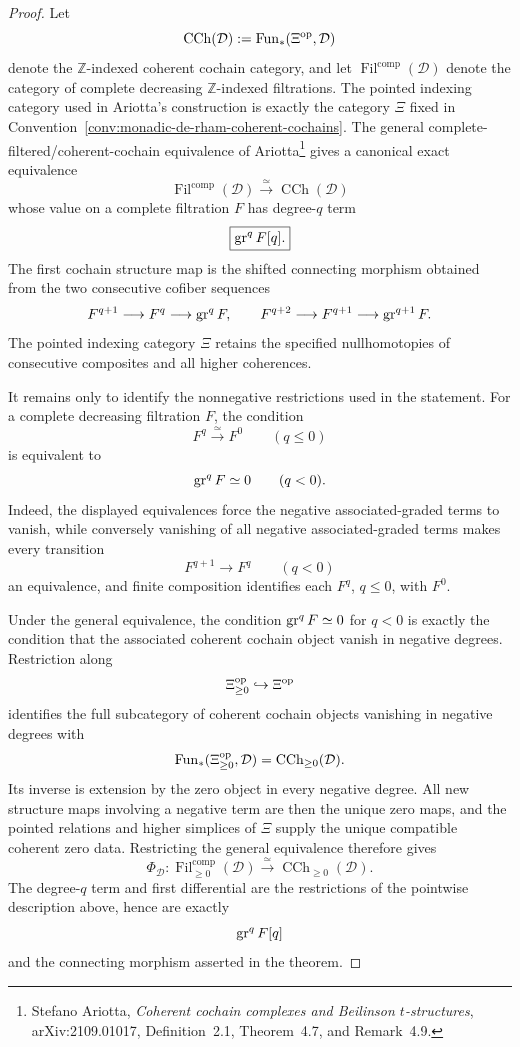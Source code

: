 \begin{proof}
Let
\[
    \operatorname{CCh}(\mathcal D)
    :=
    \operatorname{Fun}_*(\Xi^{\mathrm{op}},\mathcal D)
\]
denote the \(\mathbb Z\)-indexed coherent cochain category, and let
\(\operatorname{Fil}^{\mathrm{comp}}(\mathcal D)\) denote the category of
complete decreasing \(\mathbb Z\)-indexed filtrations.  The pointed indexing
category used in Ariotta's construction is exactly the category \(\Xi\) fixed in
Convention~\ref{conv:monadic-de-rham-coherent-cochains}.  The general
complete-filtered/coherent-cochain equivalence of Ariotta\footnote{Stefano
Ariotta, \emph{Coherent cochain complexes and Beilinson
\(t\)-structures}, arXiv:2109.01017, Definition~2.1, Theorem~4.7, and
Remark~4.9.} gives a canonical exact equivalence
\[
\boxed{
    \operatorname{Fil}^{\mathrm{comp}}(\mathcal D)
    \xrightarrow{\simeq}
    \operatorname{CCh}(\mathcal D)
}
\]
whose value on a complete filtration \(F\) has degree-\(q\) term
\[
\boxed{
    \operatorname{gr}^qF[q].
}
\]
The first cochain structure map is the shifted connecting morphism obtained
from the two consecutive cofiber sequences
\[
    F^{q+1}\longrightarrow F^q\longrightarrow\operatorname{gr}^qF,
    \qquad
    F^{q+2}\longrightarrow F^{q+1}\longrightarrow\operatorname{gr}^{q+1}F.
\]
The pointed indexing category \(\Xi\) retains the specified nullhomotopies of
consecutive composites and all higher coherences.

It remains only to identify the nonnegative restrictions used in the statement.
For a complete decreasing filtration \(F\), the condition
\[
    F^q\xrightarrow{\simeq}F^0
    \qquad(q\leq0)
\]
is equivalent to
\[
    \operatorname{gr}^qF\simeq0
    \qquad(q<0).
\]
Indeed, the displayed equivalences force the negative associated-graded terms
to vanish, while conversely vanishing of all negative associated-graded terms
makes every transition
\[
    F^{q+1}\longrightarrow F^q
    \qquad(q<0)
\]
an equivalence, and finite composition identifies each \(F^q\), \(q\leq0\),
with \(F^0\).

Under the general equivalence, the condition
\(\operatorname{gr}^qF\simeq0\) for \(q<0\) is exactly the condition that the associated
coherent cochain object vanish in negative degrees.  Restriction along
\[
    \Xi_{\geq0}^{\mathrm{op}}\hookrightarrow\Xi^{\mathrm{op}}
\]
identifies the full subcategory of coherent cochain objects vanishing in
negative degrees with
\[
    \operatorname{Fun}_*(\Xi_{\geq0}^{\mathrm{op}},\mathcal D)
    =
    \operatorname{CCh}_{\geq0}(\mathcal D).
\]
Its inverse is extension by the zero object in every negative degree.  All
new structure maps involving a negative term are then the unique zero maps,
and the pointed relations and higher simplices of \(\Xi\) supply the unique
compatible coherent zero data.  Restricting the general equivalence therefore
gives
\[
\boxed{
    \Phi_{\mathcal D}:
    \operatorname{Fil}^{\mathrm{comp}}_{\geq0}(\mathcal D)
    \xrightarrow{\simeq}
    \operatorname{CCh}_{\geq0}(\mathcal D).
}
\]
The degree-\(q\) term and first differential are the restrictions of the
pointwise description above, hence are exactly
\[
    \operatorname{gr}^qF[q]
\]
and the connecting morphism asserted in the theorem.


\end{proof}
